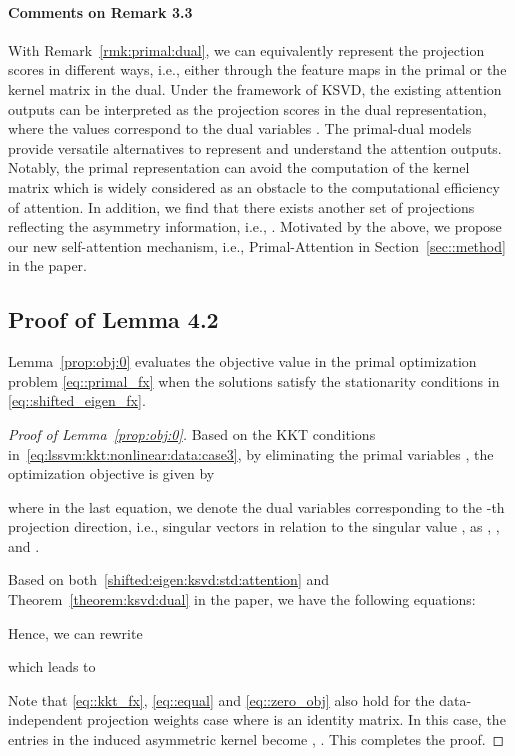 \documentclass{article}
\begin{document}
\paragraph{Comments on Remark 3.3}
With Remark~\ref{rmk:primal:dual}, we can equivalently represent the projection scores in different ways, i.e., either through the feature maps in the primal or the kernel matrix in the dual. 
Under the framework of KSVD, the existing attention outputs can be interpreted as the projection scores  in the dual representation, where the values correspond to the dual variables . 
The primal-dual models provide versatile alternatives to represent and understand the attention outputs. 
Notably, the primal representation can avoid the computation of the kernel matrix which is widely considered as an obstacle to the computational efficiency of attention.
In addition, we find that there exists another set of projections reflecting the asymmetry information, i.e., . 
Motivated by the above, we propose our new self-attention mechanism, i.e., Primal-Attention in Section~\ref{sec::method} in the paper.



\subsection{Proof of Lemma 4.2}
Lemma~\ref{prop:obj:0} evaluates the objective value  in the primal optimization problem \eqref{eq::primal_fx} when the solutions satisfy the stationarity conditions in \eqref{eq::shifted_eigen_fx}. 
\begin{proof}[Proof of Lemma~\ref{prop:obj:0}]
Based on the KKT conditions in~\eqref{eq:lssvm:kkt:nonlinear:data:case3}, by eliminating the primal variables , the optimization objective  is given by


where in the last equation, we denote the dual variables corresponding to the -th projection direction, i.e., singular vectors in relation to the singular value ,  as ,  
, and . 

Based on both~\eqref{shifted:eigen:ksvd:std:attention} and Theorem~\ref{theorem:ksvd:dual} in the paper, we have the following equations:

Hence, we can rewrite

which leads to 

Note that \eqref{eq::kkt_fx}, \eqref{eq::equal} and \eqref{eq::zero_obj} also hold for the data-independent projection weights case where  is an identity matrix.
In this case, the entries in the induced asymmetric kernel  become ,
.
This completes the proof.
\end{proof} 
\end{document}
